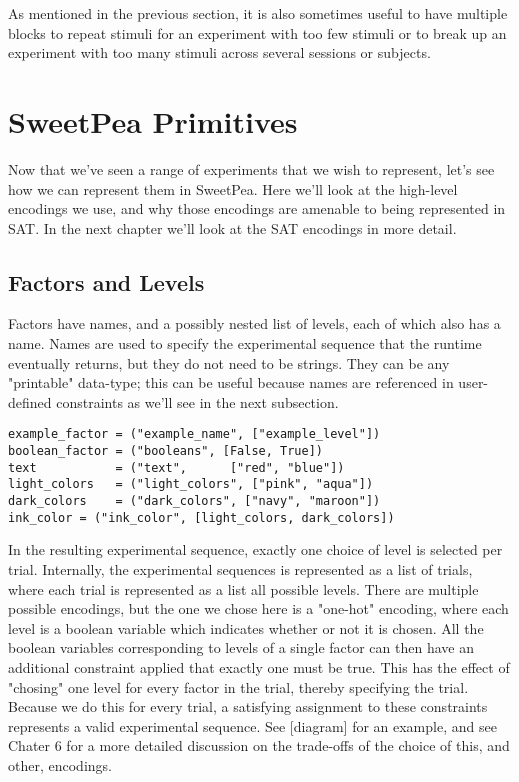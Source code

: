 As mentioned in the previous section, it is also sometimes useful to have multiple blocks to repeat stimuli for an experiment with too few stimuli or to break up an experiment with too many stimuli across several sessions or subjects.

\section{SweetPea Primitives}

Now that we've seen a range of experiments that we wish to represent, let's see how we can represent them in SweetPea. Here we'll look at the high-level encodings we use, and why those encodings are amenable to being represented in SAT. In the next chapter we'll look at the SAT encodings in more detail.

\subsection{Factors and Levels}
Factors have names, and a possibly nested list of levels, each of which also has a name. Names are used to specify the experimental sequence that the runtime eventually returns, but they do not need to be strings. They can be any "printable" data-type; this can be useful because names are referenced in user-defined constraints as we'll see in the next subsection.

\begin{verbatim}
example_factor = ("example_name", ["example_level"])
boolean_factor = ("booleans", [False, True])
text           = ("text",      ["red", "blue"])
light_colors   = ("light_colors", ["pink", "aqua"])
dark_colors    = ("dark_colors", ["navy", "maroon"])
ink_color = ("ink_color", [light_colors, dark_colors])
\end{verbatim}

In the resulting experimental sequence, exactly one choice of level is selected per trial. Internally, the experimental sequences is represented as a list of trials, where each trial is represented as a list all possible levels. There are multiple possible encodings, but the one we chose here is a "one-hot" encoding, where each level is a boolean variable which indicates whether or not it is chosen. All the boolean variables corresponding to levels of a single factor can then have an additional constraint applied that exactly one must be true. This has the effect of "chosing" one level for every factor in the trial, thereby specifying the trial. Because we do this for every trial, a satisfying assignment to these constraints represents a valid experimental sequence. See [diagram] for an example, and see Chater 6 for a more detailed discussion on the trade-offs of the choice of this, and other, encodings.

